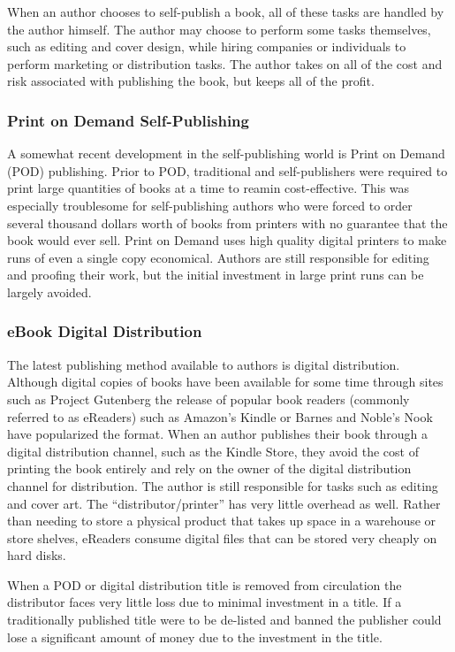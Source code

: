 \documentclass[11pt]{article}
\begin{document}
\begin{multicols}{2}
When an author chooses to self-publish a book, all of these tasks are handled by the author himself.  The author may choose to perform some tasks themselves, such as editing and cover design, while hiring companies or individuals to perform marketing or distribution tasks. The author takes on all of the cost and risk associated with publishing the book, but keeps all of the profit.

\subsubsection{Print on Demand Self-Publishing}

A somewhat recent development in the self-publishing world is Print on Demand  (POD) publishing.  Prior to POD, traditional and self-publishers were required to print large quantities of books at a time to reamin cost-effective. This was especially troublesome for self-publishing authors who were forced to order several thousand dollars worth of books \cite{EHowSelfPub} from printers with no guarantee that the book would ever sell.  Print on Demand uses high quality digital printers to make runs of even a single copy economical. Authors are still responsible for editing and proofing their work, but the initial investment in large print runs can be largely avoided.

\subsubsection{eBook Digital Distribution}

The latest publishing method available to authors is digital distribution.  Although digital copies of books have been available for some time through sites such as Project Gutenberg \cite{ProjectGutenberg} the release of popular book readers (commonly referred to as eReaders) such as Amazon's Kindle or Barnes and Noble's Nook have popularized the format.  When an author publishes their book through a digital distribution channel, such as the Kindle Store, they avoid the cost of printing the book entirely and rely on the owner of the digital distribution channel for distribution.  The author is still responsible for tasks such as editing and cover art.  The ``distributor/printer'' has very little overhead as well.  Rather than needing to store a physical product that takes up space in a warehouse or store shelves, eReaders consume digital files that can be stored very cheaply on hard disks.

When a POD or digital distribution title is removed from circulation the distributor faces very little loss due to minimal investment in a title.  If a traditionally published title were to be de-listed and banned the publisher could lose a significant amount of money due to the investment in the title. 


\end{multicols}
\end{document}
